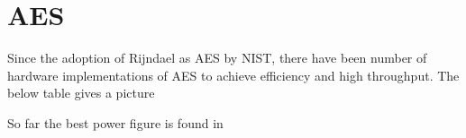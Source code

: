 \section{AES}
\label{sec:aes}

Since the adoption of Rijndael as AES by NIST, there have been number of hardware implementations of AES to achieve efficiency and high throughput. The below table gives a picture \newline





So far the best power figure is found in %


